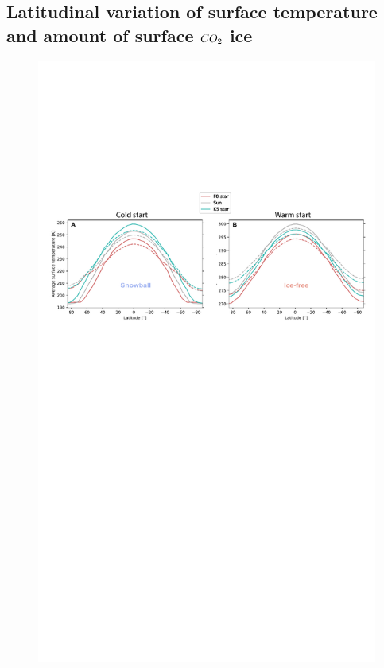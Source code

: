 \documentclass[fleqn,usenatbib]{mnras}
\providecommand{\DIFdelend}{} %
\DeclareRobustCommand{\DIFdelend}{\DIFOaddend \let\includegraphics\DIFOincludegraphics} %
\begin{document}
\DIFdelend %

\subsection{Latitudinal variation of surface temperature and amount of surface $CO_{\rm 2}$ ice}
\label{sec:surf_temp} 

\begin{figure}
	\includegraphics[width=\textwidth]{Figures/Comparison_a0_rev.pdf}

\end{figure}
\end{document}
